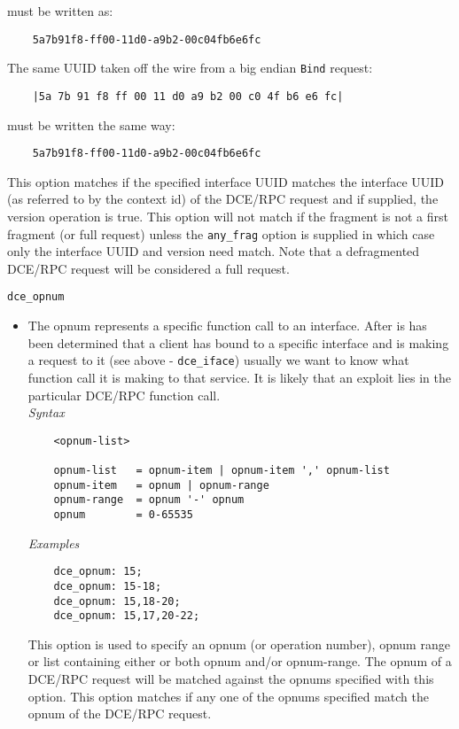\documentclass[english]{report}
\begin{document}
\begin{itemize}
must be written as:

\begin{verbatim}
    5a7b91f8-ff00-11d0-a9b2-00c04fb6e6fc
\end{verbatim}

The same UUID taken off the wire from a big endian \texttt{Bind} request:

\begin{verbatim}
    |5a 7b 91 f8 ff 00 11 d0 a9 b2 00 c0 4f b6 e6 fc|
\end{verbatim}

must be written the same way:

\begin{verbatim}
    5a7b91f8-ff00-11d0-a9b2-00c04fb6e6fc
\end{verbatim}

This option matches if the specified interface UUID matches the interface UUID
(as referred to by the context id) of the DCE/RPC request and if supplied, the
version operation is true. This option will not match if the fragment is not a
first fragment (or full request) unless the \texttt{any\_frag} option is
supplied in which case only the interface UUID and version need match.  Note
that a defragmented DCE/RPC request will be considered a full request.

\end{itemize}

\texttt{dce\_opnum}
\label{dcerpc2:dce_opnum}
\begin{itemize}

\item[] The opnum represents a specific function call to an interface. After is
has been determined that a client has bound to a specific interface and is
making a request to it (see above - \texttt{dce\_iface}) usually we want to
know what function call it is making to that service. It is likely that an
exploit lies in the particular DCE/RPC function call.\\

\textit{Syntax}
\footnotesize
\begin{verbatim}
    <opnum-list>

    opnum-list   = opnum-item | opnum-item ',' opnum-list
    opnum-item   = opnum | opnum-range
    opnum-range  = opnum '-' opnum
    opnum        = 0-65535
\end{verbatim}
\normalsize
\textit{Examples}
\footnotesize
\begin{verbatim}
    dce_opnum: 15;
    dce_opnum: 15-18;
    dce_opnum: 15,18-20;
    dce_opnum: 15,17,20-22;
\end{verbatim}
\normalsize

This option is used to specify an opnum (or operation number), opnum range or
list containing either or both opnum and/or opnum-range. The opnum of a DCE/RPC
request will be matched against the opnums specified with this option.  This
option matches if any one of the opnums specified match the opnum of the
DCE/RPC request.

\end{itemize}
\end{document}
